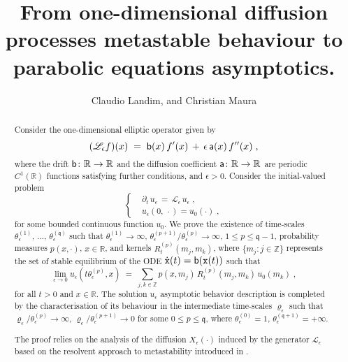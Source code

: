\documentclass[reqno]{amsart}
\title[One-dimensional parabolic equations asymptotics]{From
one-dimensional diffusion processes metastable behaviour to parabolic
equations asymptotics.  }
\author{Claudio Landim, and Christian Maura}
\theoremstyle{plain}
\theoremstyle{definition}
\newcommand{\bb}[1]{{\mathbb #1}}
\newcommand{\ms}[1]{{\mathscr #1}}
\newcommand{\mss}[1]{{\textsf #1}}
\newcommand{\mtt}[1]{{\mathtt #1}}
\newcounter{as}[section]
\newcommand{\<}{\langle}
\renewcommand{\>}{\rangle}
\begin{document}
 \maketitle

\begin{abstract}
Consider the one-dimensional elliptic operator given by
\begin{equation*}
(\ms L_\epsilon f)(x)  \;=\;
\mss b (x) \, f'(x)  \,+\,
\epsilon\, \mss a (x)\, f''(x) \;,
\end{equation*}
where the drift $\mss b\colon \bb R \to \bb R$ and the diffusion
coefficient $\mss a\colon \bb R \to \bb R$ are periodic $C^1(\bb R)$
functions satisfying further conditions, and $\epsilon>0$.  Consider
the initial-valued problem
\begin{equation*}
\left\{ \begin{aligned} &
\partial_{t}\,u_{\epsilon}\,=\,\mathscr{L}_{\epsilon}\,u_{\epsilon}\;,\\
& u_{\epsilon}(0,\,\cdot)=u_{0}(\cdot)\;,
\end{aligned}
\right.\end{equation*} for some bounded continuous function
$u_{0}$. We prove the existence of time-scales
$\theta_{\epsilon}^{(1)},\,\dots,\,\theta_{\epsilon}^{(\mathfrak{q})}$
such that $\theta_{\epsilon}^{(1)}\to\infty$,
$\theta_{\epsilon}^{(p+1)}/\theta_{\epsilon}^{(p)}\to\infty$,
$1\le p\le\mathfrak{q}-1$, probability measures $p(x,\cdot)$, $x\in
\bb R$, and kernels $R_{t}^{(p)}(m_j,m_k)$, where $\{m_j:j\in\bb Z\}$
represents the set of stable equilibrium of the ODE $\dot{\mtt x}(t) =
\mss b(\mtt x(t))$ such that 
\begin{equation*}
\lim_{\epsilon\to0} u_{\epsilon}(t\theta_{\epsilon}^{(p)}, x)
\;=\;\sum_{j,k\in \bb Z} p(x,m_j)\, R_{t}^{(p)} (m_j,m_k) \,u_{0}(m_k)\;,
\end{equation*}
for all $t>0$ and $x\in \bb R$. The solution $u_{\epsilon}$ asymptotic
behavior description is completed by the characterisation of its
behaviour in the intermediate time-scales $\varrho_{\epsilon}$ such
that $\varrho_{\epsilon}/\theta_{\epsilon}^{(p)}\to\infty$,
$\varrho_{\epsilon}/\theta_{\epsilon}^{(p+1)}\to0$ for some
$0\le p\le\mathfrak{q}$, where $\theta_{\epsilon}^{(0)}=1$,
$\theta_{\epsilon}^{(\mathfrak{q}+1)}=+\infty$.

The proof relies on the analysis of the diffusion $X_\epsilon(\cdot)$
induced by the generator $\ms L_\epsilon$ based on the resolvent
approach to metastability introduced in \cite{lms}.
\end{abstract}
\end{document}
